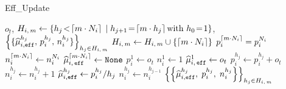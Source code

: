 \begin{minipage}{\textwidth}
\renewcommand*\footnoterule{}
\begin{savenotes}
\begin{algorithm}[H]
\caption{{\small\sc Eff\_Update}}
\begin{algorithmic}[1]
\label{alg:effupdate}
\Require $o_t$, \small $H_{i,\,m} \gets \left\{h_j \! <\! \left\lceil m \cdot N_i\right\rceil \; | \;  h_{j+1} \!=\! \left\lceil m \cdot h_j\right\rceil  \text{with } h_0 \!=\! 1\right\} $\normalsize, $\left\{ \{ \widehat{\mu}_{i,\texttt{eff}}^{h_j},\, p_i^{h_j}, \, n_i^{h_j} \}\right\}_{h_j \in H_{i,\,m}}$
\label{algline:effu-new-condition}   
\State $H_{i,\,m} \gets H_{i,\,m} \cup \left\{ \left\lceil m \cdot N_i\right\rceil \right\}$\label{algline:effu-new-h}
\State $p_i^{\left\lceil m \cdot N_i\right\rceil } = p_i^{N_i} $\label{algline:effu-new-p}
\State $n_i^{\left\lceil m \cdot N_i\right\rceil } \gets n_i^{N_i} $\label{algline:effu-new-n}
\State $\widehat{\mu}_{i, \, \texttt{eff}}^{\left\lceil m \cdot N_i\right\rceil }\leftarrow \texttt{None}$\label{algline:effu-new-mu}
\EndIf\label{algline:effu-new-end} 
\State $p_i^{1} \gets o_t$ \label{algline:effu-update-first-p} 
\State $n_i^{1} \gets 1$\label{algline:effu-update-first-n}
\State $\widehat{\mu}_{i, \, \texttt{eff}}^{1}\leftarrow o_t$ \label{algline:effu-update-first-hmu}
\label{algline:effu-update-start} 
\State $p_i^{h_j} \gets p_i^{h_j}  +o_t$\label{algline:effu-update-p}
\State $n_i^{h_j} \gets n_i^{h_j} + 1$\label{algline:effu-update-n}
\EndFor\label{algline:effu-update-end} 
\label{algline:effu-refresh-start}
 \label{algline:effu-refresh-condition}
\State $\widehat{\mu}_{i,\texttt{eff}}^{h_j} \leftarrow p_i^{h_j}/h_j$ \label{algline:effu-refresh-hmu}
 \label{algline:effu-refresh-p}
\State $n_i^{h_{j}} \gets n_i^{h_{j-1}} $\label{algline:effu-refresh-n}
\EndIf
\EndFor \label{algline:effu-refresh-end}
\Ensure $\left\{\left\{  \widehat{\mu}_{i,\texttt{eff}}^{h_j},\; p_i^{h_j}, \; n_i^{h_j} \right\}\right\}_{h_j \in H_{i,\,m}}$
\end{algorithmic}
\end{algorithm}
\end{savenotes}
\end{minipage}




